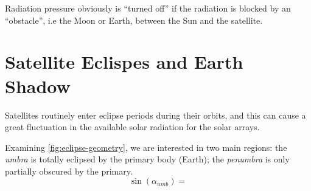 Radiation pressure obviously is ``turned oﬀ'' if the radiation is blocked by an 
``obstacle'', i.e the Moon or Earth, between the Sun and the satellite. 

\section{Satellite Eclispes and Earth Shadow}
Satellites routinely enter eclipse periods during their orbits, and
this can cause a great fluctuation in the available solar radiation for the solar 
arrays.

Examining \ref{fig:eclipse-geometry}, we are interested in two main regions: the 
\emph{umbra} is totally eclipsed by the primary body (Earth); the \emph{penumbra} 
is only partially obscured by the primary.
\begin{equation}
    \sin({\alpha}_{umb}) = 
\end{equation}

